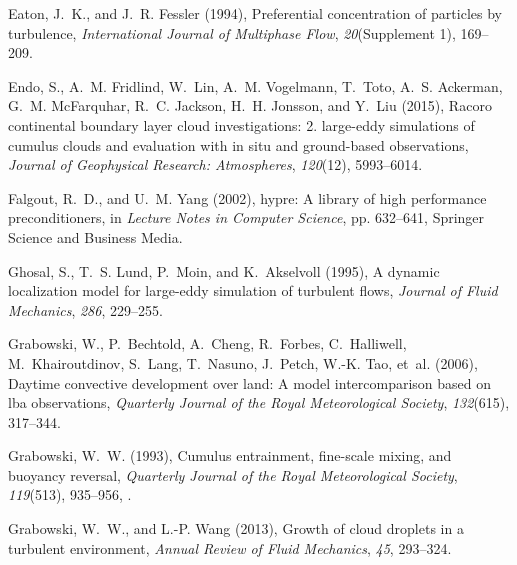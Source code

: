 \documentclass[draft,linenumbers]{agujournal}
\begin{document}
\begin{thebibliography}{60}
Eaton, J.~K., and J.~R. Fessler (1994), Preferential concentration of particles
  by turbulence, \textit{International Journal of Multiphase Flow},
  \textit{20}(Supplement 1), 169--209.

Endo, S., A.~M. Fridlind, W.~Lin, A.~M. Vogelmann, T.~Toto, A.~S. Ackerman,
  G.~M. McFarquhar, R.~C. Jackson, H.~H. Jonsson, and Y.~Liu (2015), Racoro
  continental boundary layer cloud investigations: 2. large-eddy simulations of
  cumulus clouds and evaluation with in situ and ground-based observations,
  \textit{Journal of Geophysical Research: Atmospheres}, \textit{120}(12),
  5993--6014.

Falgout, R.~D., and U.~M. Yang (2002), hypre: A library of high performance
  preconditioners, in \textit{Lecture Notes in Computer Science}, pp. 632--641,
  Springer Science and Business Media.

Ghosal, S., T.~S. Lund, P.~Moin, and K.~Akselvoll (1995), A dynamic
  localization model for large-eddy simulation of turbulent flows,
  \textit{Journal of Fluid Mechanics}, \textit{286}, 229--255.

Grabowski, W., P.~Bechtold, A.~Cheng, R.~Forbes, C.~Halliwell,
  M.~Khairoutdinov, S.~Lang, T.~Nasuno, J.~Petch, W.-K. Tao, et~al. (2006),
  Daytime convective development over land: A model intercomparison based on
  lba observations, \textit{Quarterly Journal of the Royal Meteorological
  Society}, \textit{132}(615), 317--344.

Grabowski, W.~W. (1993), Cumulus entrainment, fine-scale mixing, and buoyancy
  reversal, \textit{Quarterly Journal of the Royal Meteorological Society},
  \textit{119}(513), 935--956, .

Grabowski, W.~W., and L.-P. Wang (2013), Growth of cloud droplets in a
  turbulent environment, \textit{Annual Review of Fluid Mechanics},
  \textit{45}, 293--324.


\end{thebibliography}
\end{document}
